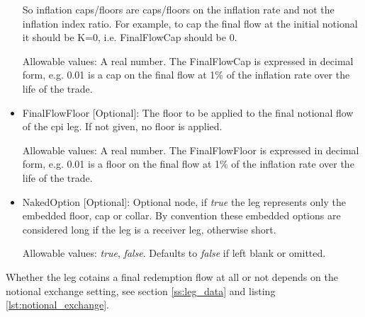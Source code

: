 \begin{itemize}
So inflation caps/floors are caps/floors on the inflation rate and not the inflation index ratio. For example, to cap the final flow at the initial notional  it should be K=0, i.e. FinalFlowCap should be 0.  


Allowable values: A real number. The FinalFlowCap is expressed in decimal form, e.g. 0.01 is a cap on the final flow at 1\% of the inflation rate over the life of the trade.


\item FinalFlowFloor [Optional]: The floor to be applied to the final notional flow of the cpi leg. If not given, no floor
  is applied.


Allowable values: A real number. The FinalFlowFloor is expressed in decimal form, e.g. 0.01 is a floor on the final flow at 1\% of the inflation rate over the life of the trade.

\item NakedOption [Optional]: Optional node, if \emph{true} the leg represents only the embedded floor, cap or collar. 
By convention these embedded options are considered long if the leg is a receiver leg, otherwise short. 
 
 Allowable values:  \emph{true}, \emph{false}. Defaults to \emph{false} if left blank or omitted.
 
\end{itemize} 

Whether the leg cotains a final redemption flow at all or not depends on the
 notional exchange setting, see section \ref{ss:leg_data} and listing \ref{lst:notional_exchange}.

